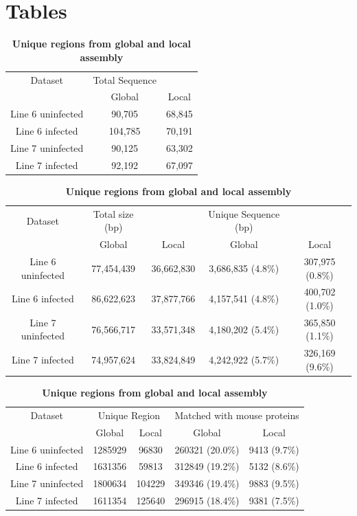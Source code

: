 \documentclass[10pt]{article}
\begin{document}
\section*{Tables}
\begin{table}[!ht]

\caption{
\bf{Total unique sequences from global and local assembly (k=$21-31$)}}
\begin{tabular}{ccc}
\hline
Dataset & Total Sequence & \\
        & Global & Local \\
\hline
Line 6 uninfected & 90,705 & 68,845\\
Line 6 infected & 104,785 & 70,191 \\
Line 7 uninfected & 90,125 & 63,302\\
Line 7 infected &  92,192 & 67,097 \\
\hline
\end{tabular}
\label{total_sequences}

\caption{
\bf{Unique sequences between global and local assembly}}
\begin{tabular}{ccccc}
\hline
Dataset & Total size (bp) & & Unique Sequence (bp) & \\
        & Global & Local & Global & Local\\
\hline
Line 6 uninfected & 77,454,439 & 36,662,830 & 3,686,835 (4.8\%) & 307,975 (0.8\%)\\
Line 6 infected & 86,622,623 & 37,877,766 & 4,157,541 (4.8\%)& 400,702 (1.0\%)\\
Line 7 uninfected & 76,566,717 & 33,571,348 & 4,180,202 (5.4\%) & 365,850 (1.1\%)\\
Line 7 infected & 74,957,624 & 33,824,849 & 4,242,922 (5.7\%)& 326,169 (9.6\%)\\
\hline
\end{tabular}
\label{unique_sequences}

\caption{
\bf{Unique regions from global and local assembly}}
\begin{tabular}{ccccc}
\hline
Dataset & \multicolumn{2}{c}{Unique Region} & \multicolumn{2}{c}{Matched with mouse proteins}\\
 & Global & Local & Global & Local\\
\hline
Line 6 uninfected & 1285929 & 96830 & 260321 (20.0\%) & 9413 (9.7\%)\\
Line 6 infected & 1631356 & 59813 & 312849 (19.2\%)& 5132 (8.6\%)\\
Line 7 uninfected & 1800634 & 104229 & 349346 (19.4\%) & 9883 (9.5\%)\\
Line 7 infected & 1611354 & 125640 & 296915 (18.4\%)& 9381 (7.5\%)\\
\hline
\end{tabular}
\label{unique_sequences_matched_mouse}


\end{table}
\end{document}
